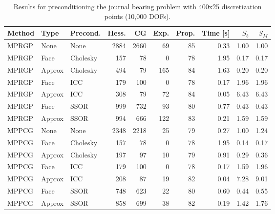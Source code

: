 \documentclass[11pt]{article}
\theoremstyle{plain}
\theoremstyle{definition}
\begin{document}
\begin{table}[htbp]
\centering
\begin{tabular}{l *{2}{|l} *{7}{|r}}
  Method & Type & Precond. & Hess. & CG & Exp. & Prop. & Time [s] & $S_b$ & $S_M$\\\hline
MPRGP & None & None & 2884 & 2660 & 69 & 85 & 0.33 & 1.00 & 1.00\\ \hline
MPRGP & Face & Cholesky & 157 & 78 & 0 & 78 & 1.95 & 0.17 & 0.17\\
MPRGP & Approx & Cholesky & 494 & 79 & 165 & 84 & 1.63 & 0.20 & 0.20\\ \hline
MPRGP & Face & ICC & 179 & 100 & 0 & 78 & 0.17 & 1.96 & 1.96\\
MPRGP & Approx & ICC & 308 & 79 & 72 & 84 & 0.05 & 6.43 & 6.43\\ \hline
MPRGP & Face & SSOR & 999 & 732 & 93 & 80 & 0.77 & 0.43 & 0.43\\
MPRGP & Approx & SSOR & 994 & 666 & 122 & 83 & 0.21 & 1.59 & 1.59\\ \hline \hline

MPPCG & None & None & 2348 & 2218 & 25 & 79 & 0.27 & 1.00 & 1.24\\ \hline
MPPCG & Face & Cholesky & 157 & 78 & 0 & 78 & 1.95 & 0.14 & 0.17\\
MPPCG & Approx & Cholesky & 197 & 97 & 10 & 79 & 0.91 & 0.29 & 0.36\\ \hline
MPPCG & Face & ICC & 179 & 100 & 0 & 78 & 0.17 & 1.59 & 1.96\\
MPPCG & Approx & ICC & 208 & 87 & 19 & 82 & 0.04 & 7.28 & 9.01\\ \hline
MPPCG & Face & SSOR & 748 & 623 & 22 & 80 & 0.60 & 0.44 & 0.55\\
MPPCG & Approx & SSOR & 858 & 699 & 38 & 82 & 0.19 & 1.42 & 1.76\\
\end{tabular}
\caption[Preconditioned journal bearing problem I.]{Results for preconditioning the journal bearing problem with 400x25 discretization points (10,000 DOFs).}
\label{tab:precondJb}
\end{table}
\end{document}
